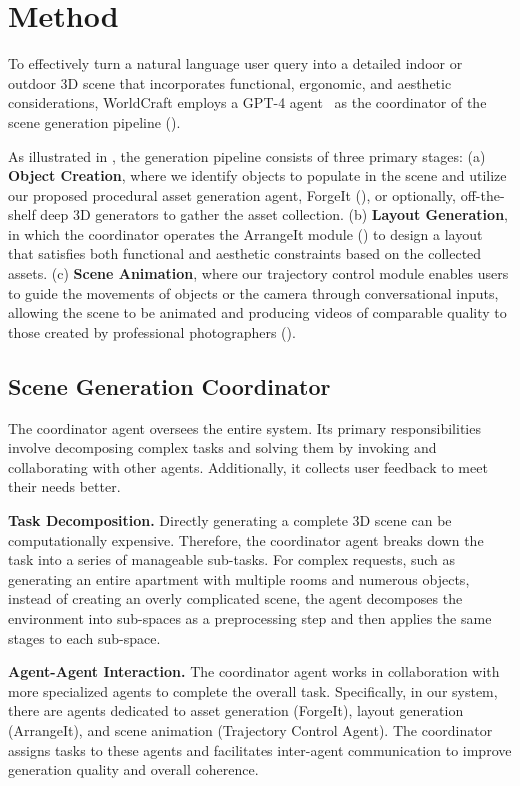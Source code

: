 \section{Method}
To effectively turn a natural language user query into a detailed indoor or outdoor 3D scene that incorporates functional, ergonomic, and aesthetic considerations, WorldCraft employs a GPT-4 agent~\cite{achiam2023gpt} as the coordinator of the scene generation pipeline ().

As illustrated in , the generation pipeline consists of three primary stages: 
(a) \textbf{Object Creation}, where we identify objects to populate in the scene and utilize our proposed procedural asset generation agent, ForgeIt (), or optionally, off-the-shelf deep 3D generators to gather the asset collection. 
(b) \textbf{Layout Generation}, in which the coordinator operates the ArrangeIt module () to design a layout that satisfies both functional and aesthetic constraints based on the collected assets. 
(c) \textbf{Scene Animation}, where our trajectory control module enables users to guide the movements of objects or the camera through conversational inputs, allowing the scene to be animated and producing videos of comparable quality to those created by professional photographers ().




\subsection{Scene Generation Coordinator}
\label{sec:coordinator}
The coordinator agent oversees the entire system. Its primary responsibilities involve decomposing complex tasks and solving them by invoking and collaborating with other agents. Additionally, it collects user feedback to meet their needs better.

\noindent\textbf{Task Decomposition.} Directly generating a complete 3D scene can be computationally expensive. Therefore, the coordinator agent breaks down the task into a series of manageable sub-tasks. For complex requests, such as generating an entire apartment with multiple rooms and numerous objects, instead of creating an overly complicated scene, the agent decomposes the environment into sub-spaces as a preprocessing step and then applies the same stages to each sub-space.

\noindent\textbf{Agent-Agent Interaction.} The coordinator agent works in collaboration with more specialized agents to complete the overall task. Specifically, in our system, there are agents dedicated to asset generation (ForgeIt), layout generation (ArrangeIt), and scene animation (Trajectory Control Agent). The coordinator assigns tasks to these agents and facilitates inter-agent communication to improve generation quality and overall coherence.

